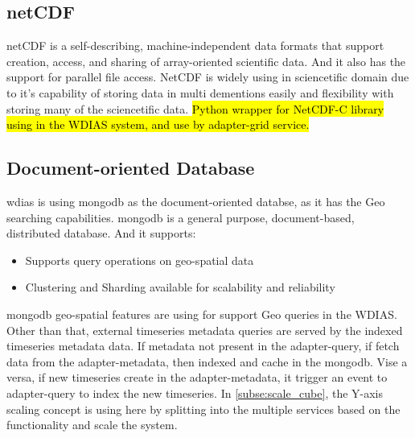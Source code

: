 \subsection{\acrfull{netCDF}} 
\label{subse:netcdf}
\acrshort{netCDF} \cite{unidataUnidataNetCDF} is a self-describing, machine-independent data formats that support creation, access, and sharing of array-oriented scientific data.
And it also has the support for parallel file access.
NetCDF is widely using in sciencetific domain due to it's capability of storing data in multi dementions easily and flexibility with storing many of the sciencetific data. \hl{
Python wrapper for NetCDF-C library using in the WDIAS system, and use by adapter-grid service.}

\subsection{Document-oriented Database}
\label{subse:mongodb}

\acrshort{wdias} is using \acrshort{mongodb} as the document-oriented databse, as it has the Geo searching capabilities.
\acrshort{mongodb} \cite{mongodbMongoDBManual} is a general purpose, document-based, distributed database. And it supports:
\begin{itemize}
  \item Supports query operations on geo-spatial data \cite{mongodbMongoDBManual}
  \item Clustering and Sharding available for scalability and reliability
\end{itemize}
\acrshort{mongodb} geo-spatial features are using for support Geo queries in the WDIAS. Other than that, external timeseries metadata queries are served by the indexed timeseries metadata data.
If metadata not present in the adapter-query, if fetch data from the adapter-metadata, then indexed and cache in the \acrshort{mongodb}. Vise a versa, if new timeseries create in the adapter-metadata, it trigger an event to adapter-query to index the new timeseries.
In \cref{subse:scale_cube}, the Y-axis scaling concept is using here by splitting into the multiple services based on the functionality and scale the system.

